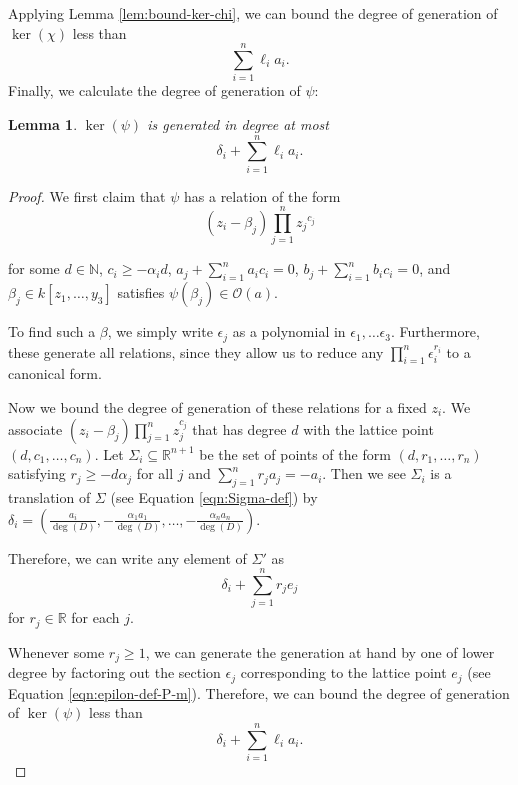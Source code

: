 \documentclass{amsart}
\theoremstyle{plain}
\newtheorem{lem}[thm]{Lemma}
\theoremstyle{definition}
\theoremstyle{remark}
\numberwithin{equation}{section}
\newcommand\bida{a}
\newcommand\bidb{b}
\begin{document}
Applying Lemma \ref{lem:bound-ker-chi}, we can bound the degree of generation of $\ker(\chi)$ less than
\[
	\sum_{i=1}^n \ell_i a_i.
\]
Finally, we calculate the degree of generation of $\psi$:

\begin{lem}\label{P-m-relations-psi}
$\ker(\psi)$ is generated in degree at most 
\[
	\delta_i + \sum_{i=1}^n \ell_i a_i.
\]
\end{lem}
\begin{proof}
We first claim that $\psi$ has a relation of the form
\begin{equation}\label{eqn:relations-psi}
	(z_i - \beta_j)\prod_{j=1}^n {z_j}^{c_{j}}
\end{equation}

\noindent
for some $d \in \mathbb{N}$, $c_i \ge -\alpha_i d$, $\bida_j + \sum_{i = 1}
^n \bida_i c_i = 0$, $\bidb_j + \sum_{i=1}^n \bidb_i c_i = 0$, and $\beta_j \in
k[z_1, \ldots, y_3]$ satisfies $\psi(\beta_j)\in \mathscr{O}(\bida)$.

To find such a $\beta$, we simply write $\epsilon_j$ as a 
polynomial in $\epsilon_1, \ldots \epsilon _3$. Furthermore, these
generate all relations, since they allow us to reduce any $\prod_{i =
1}^n \epsilon_i^{r_i}$ to a canonical form. 

Now we bound the degree of generation of these relations for a fixed $z_i$.  We associate $(z_i - \beta_j)\prod_{j=1}^n z_j^{c_j}$ that has degree $d$ with the lattice point $(d, c_1, \ldots, c_n)$.  Let $\Sigma_i \subseteq \mathbb{R}^{n+1}$ be the set of points of the form $(d, r_1, \ldots, r_n)$ satisfying $r_j \ge -d \alpha_j$ for all $j$ and $\sum_{j=1}^n r_j a_j = -a_i$.  Then we see $\Sigma_i$ is a translation of $\Sigma$ (see Equation \ref{eqn:Sigma-def}) by $\delta_i = (\frac{a_i}{\deg(D)}, -\frac{\alpha_1 a_1}{\deg(D)}, \ldots, - \frac{\alpha_n a_n}{\deg(D)})$.

Therefore, we can write any element of $\Sigma'$ as
\[
	\delta_i + \sum_{j=1}^n r_j e_j
\]
for $r_j \in \mathbb{R}$ for each $j$.

Whenever some $r_j \ge 1$, we can generate the generation at hand by one of lower degree by factoring out the section $\epsilon_j$ corresponding to the lattice point $e_j$ (see Equation \ref{eqn:epilon-def-P-m}).  Therefore, we can bound the degree of generation of $\ker(\psi)$ less than
\[
	\delta_i + \sum_{i=1}^n \ell_i a_i.
\]
\end{proof}
\end{document}

